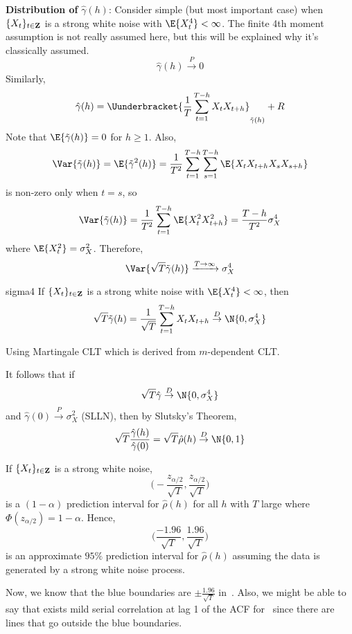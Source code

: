 \textbf{Distribution of} $ \hat{\gamma}(h) $: Consider
simple (but most important case) when $ \{X_t\}_{t\in\mathbf{Z}} $
is a strong white noise with $ \E{X_t^4}<\infty $. The finite
4th moment assumption is not really assumed here, but this will
be explained why it's classically assumed.
\[ \hat{\gamma}(h)\stackrel{P}{\to}0 \]
Similarly,
\[ \hat{\gamma}(h)=\Uunderbracket{\frac{1}{T}\sum_{t=1}^{T-h}X_t X_{t+h}}_{\tilde{\gamma}(h)}+R   \]
Note that $ \E{\tilde{\gamma}(h)}=0 $ for $ h\ge 1 $. Also,
\[ \Var{\tilde{\gamma}(h)}=\E{\tilde{\gamma}^2(h)}=
    \frac{1}{T^2}\sum_{t=1}^{T-h} \sum_{s=1}^{T-h}
    \E{X_t X_{t+h}X_s X_{s+h}} \]
is non-zero only when $ t=s $, so
\[ \Var{\tilde{\gamma}(h)}=\frac{1}{T^2} \sum_{t=1}^{T-h} \E{X_t^2 X_{t+h}^2}=
    \frac{T-h}{T^2} \sigma_X^4 \]
where $ \E{X_t^2}=\sigma_X^2 $. Therefore,
\[ \Var{\sqrt{T}\tilde{\gamma}(h)}
    \xrightarrow{T\to\infty}\sigma_X^4 \]
\begin{Theorem}{}{sigma4}
    If $ \{X_t\}_{t\in\mathbf{Z}} $ is a strong white noise
    with $ \E{X_t^4}<\infty $, then
    \[ \sqrt{T}\tilde{\gamma}(h)=\frac{1}{\sqrt{T}} \sum_{t=1}^{T-h} X_t X_{t+h}
        \stackrel{D}{\to}\N{0,\sigma_X^4} \]
\end{Theorem}
\begin{Proof}{}{}
    Using Martingale CLT which is derived from $ m $-dependent CLT.\@
\end{Proof}
\begin{Corollary}{}{}
    It follows that if
    \[ \sqrt{T}\hat{\gamma}\stackrel{D}{\to}\N{0,\sigma_X^4} \]
    and $ \hat{\gamma}(0)\stackrel{P}{\to}\sigma_X^2 $ (SLLN), then by Slutsky's Theorem,
    \[ \sqrt{T}\frac{\hat{\gamma}(h)}{\hat{\gamma}(0)}=
        \sqrt{T}\hat{\rho}(h)\stackrel{D}{\to}\N{0,1}  \]
\end{Corollary}
If $ \{X_t\}_{t\in\mathbf{Z}} $ is a strong white noise,
\[ \biggl(-\frac{z_{\alpha/2}}{\sqrt{T}} ,\frac{z_{\alpha/2}}{\sqrt{T}} \biggr) \]
is a $ (1-\alpha) $ prediction interval for $ \hat{\rho}(h) $
for all $ h $ with $ T $ large where $ \Phi(z_{\alpha/2})=1-\alpha $. Hence,
\[ \biggl(\frac{-1.96}{\sqrt{T}},\frac{1.96}{\sqrt{T}} \biggr) \]
is an approximate $ 95\% $ prediction interval for $ \hat{\rho}(h) $
assuming the data is generated by a strong white noise process.

Now, we know that the blue boundaries are $ \displaystyle \pm \frac{1.96}{\sqrt{T}} $
in~. Also, we might be able to say that
exists mild serial correlation at lag 1 of the ACF for~
since there are lines that go outside the blue boundaries.

